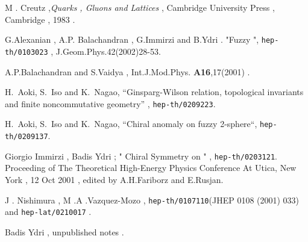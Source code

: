 \documentclass[a4paper,10pt]{article}
\begin{document}
\begin{thebibliography}{99}
M . Creutz ,{\em Quarks , Gluons and Lattices} , Cambridge
University Press , Cambridge , 1983 .

G.Alexanian , A.P. Balachandran , G.Immirzi and B.Ydri . "Fuzzy
\coordHE{}", {\tt hep-th/0103023} ,
J.Geom.Phys.42(2002)28-53.

A.P.Balachandran and S.Vaidya , Int.J.Mod.Phys.{\bf
A16},17(2001) .

H.~Aoki, S.~Iso and K.~Nagao,
``Ginsparg-Wilson relation, topological invariants and finite 
noncommutative geometry'' , {\tt hep-th/0209223}.


H.~Aoki, S.~Iso and K.~Nagao, ``Chiral anomaly on fuzzy 2-sphere``, {\tt hep-th/0209137}.


Giorgio Immirzi , Badis Ydri ; " Chiral Symmetry on \coordHE{}" , {\tt hep-th/0203121}. Proceeding of The Theoretical
High-Energy Physics Conference At Utica, New York , 12 Oct 2001 ,
edited by A.H.Fariborz and E.Rusjan.

J . Nishimura  , M .A .Vazquez-Mozo ,  {\tt hep-th/0107110}(JHEP 0108 (2001) 033) and  {\tt hep-lat/0210017} .

Badis Ydri , unpublished notes .


\end{thebibliography}
\end{document}
